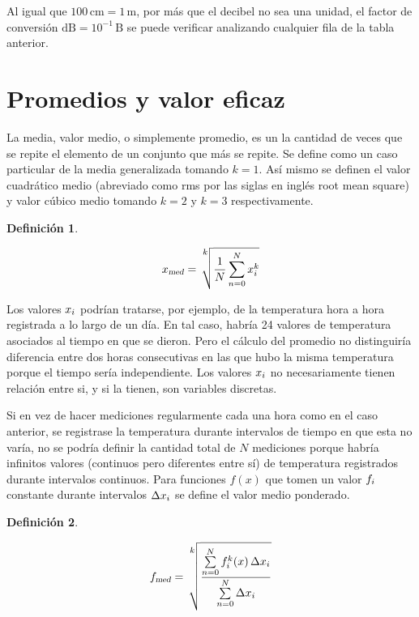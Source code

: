 \documentclass[a5paper,12pt,twoside]{book}
\newtheorem{defn}{{Definición}}[chapter]
\begin{document}
Al igual que $100\,\si{\centi\metre} = 1\,\si{\metre}$, por más que el decibel no sea una unidad, el factor de conversión $\si{\deci\bel} = 10^{-1} \,\si{\bel}$ se puede verificar analizando cualquier fila de la tabla anterior.


\section{Promedios y valor eficaz}

La media, valor medio, o simplemente promedio, es un la cantidad de veces que se repite el elemento de un conjunto que más se repite. Se define como un caso particular de la media generalizada tomando $k=1$. Así mismo se definen el valor cuadrático medio (abreviado como rms por las siglas en inglés root mean square) y valor cúbico medio tomando $k=2$ y $k=3$ respectivamente.

\begin{mdframed}[style=MyFrame1]
    \begin{defn}
    \end{defn}
    \begin{equation*}
        \ave{x} = \sqrt[\uproot{20} \scriptstyle k]{ \frac{1}{N} \sum_{n=0}^{N} x_\ith^k }
    \end{equation*}
\end{mdframed}

Los valores $x_i$ podrían tratarse, por ejemplo, de la temperatura hora a hora registrada a lo largo de un día. En tal caso, habría 24 valores de temperatura asociados al tiempo en que se dieron. Pero el cálculo del promedio no distinguiría diferencia entre dos horas consecutivas en las que hubo la misma temperatura porque el tiempo sería independiente. Los valores $x_i$ no necesariamente tienen relación entre si, y si la tienen, son variables discretas.

Si en vez de hacer mediciones regularmente cada una hora como en el caso anterior, se registrase la temperatura durante intervalos de tiempo en que esta no varía, no se podría definir la cantidad total de $N$ mediciones porque habría infinitos valores (continuos pero diferentes entre sí) de temperatura registrados durante intervalos continuos. Para funciones $f(x)$ que tomen un valor $f_i$ constante durante intervalos $\Delta x_i$ se define el valor medio ponderado.

\begin{mdframed}[style=MyFrame1]
    \begin{defn}
    \end{defn}
    \begin{equation*}
        \ave{f} = \sqrt[\uproot{36} \scriptstyle k]{ \frac{\sum\limits_{n=0}^{N} f_\ith^k(x) \, \Delta x_\ith}{\sum\limits_{n=0}^{N} \Delta x_\ith }}
    \end{equation*}
\end{mdframed}
\end{document}
